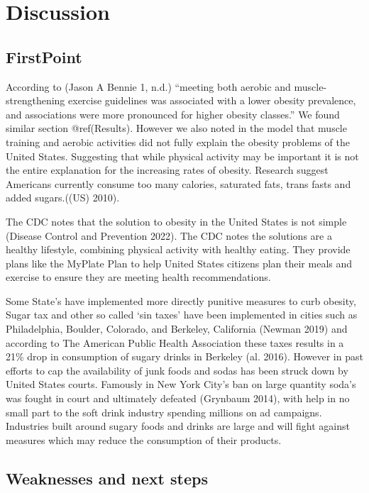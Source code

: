 \documentclass[
]{article}
\begin{document}
\hypertarget{Discussion}{%
\section{Discussion}\label{Discussion}}

\hypertarget{FirstPoint}{%
\subsection{FirstPoint}\label{FirstPoint}}

According to (Jason A Bennie 1, n.d.) ``meeting both aerobic and
muscle-strengthening exercise guidelines was associated with a lower
obesity prevalence, and associations were more pronounced for higher
obesity classes.'' We found similar section @ref(Results). However we
also noted in the model that muscle training and aerobic activities did
not fully explain the obesity problems of the United States. Suggesting
that while physical activity may be important it is not the entire
explanation for the increasing rates of obesity. Research suggest
Americans currently consume too many calories, saturated fats, trans
fasts and added sugars.((US) 2010).

The CDC notes that the solution to obesity in the United States is not
simple (Disease Control and Prevention 2022). The CDC notes the
solutions are a healthy lifestyle, combining physical activity with
healthy eating. They provide plans like the MyPlate Plan to help United
States citizens plan their meals and exercise to ensure they are meeting
health recommendations.

Some State's have implemented more directly punitive measures to curb
obesity, Sugar tax and other so called `sin taxes' have been implemented
in cities such as Philadelphia, Boulder, Colorado, and Berkeley,
California (Newman 2019) and according to The American Public Health
Association these taxes results in a 21\% drop in consumption of sugary
drinks in Berkeley (al. 2016). However in past efforts to cap the
availability of junk foods and sodas has been struck down by United
States courts. Famously in New York City's ban on large quantity soda's
was fought in court and ultimately defeated (Grynbaum 2014), with help
in no small part to the soft drink industry spending millions on ad
campaigns. Industries built around sugary foods and drinks are large and
will fight against measures which may reduce the consumption of their
products.

\hypertarget{weaknesses-and-next-steps}{%
\subsection{Weaknesses and next steps}\label{weaknesses-and-next-steps}}
\end{document}
